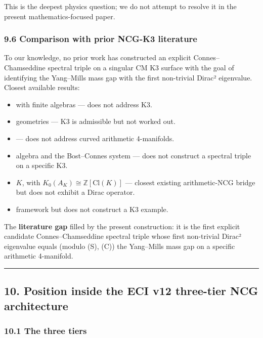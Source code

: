 \documentclass[
  11pt,
  a4paper,
]{amsart}
\providecommand{\tightlist}{\setlength{\itemsep}{0pt}\setlength{\parskip}{0pt}}
\providecommand{\tightlist}{%
  \setlength{\itemsep}{0pt}\setlength{\parskip}{0pt}}
\begin{document}
This is the deepest physics question; we do not attempt to resolve it in the
present mathematics-focused paper.

\hypertarget{comparison-with-prior-ncg-k3-literature}{%
\subsubsection{9.6 Comparison with prior NCG-K3 literature}\label{comparison-with-prior-ncg-k3-literature}}

To our knowledge, no prior work has constructed an explicit
Connes--Chamseddine spectral triple on a singular CM K3 surface with the goal
of identifying the Yang--Mills mass gap with the first non-trivial Dirac²
eigenvalue. Closest available results:

\begin{itemize}
\tightlist
\item
  with finite algebras --- does not address K3.
\item
  geometries --- K3 is admissible but not worked out.
\item
  --- does not address curved arithmetic 4-manifolds.
\item
  algebra and the Bost--Connes system --- does not construct a spectral triple on a
  specific K3.
\item
  \(K\), with \(K_0(A_K) \cong \mathbb{Z}[\mathrm{Cl}(K)]\) --- closest existing
  arithmetic-NCG bridge but does not exhibit a Dirac operator.
\item
  framework but does not construct a K3 example.
\end{itemize}

The \textbf{literature gap} filled by the present construction: it is the first
explicit candidate Connes--Chamseddine spectral triple whose first non-trivial
Dirac² eigenvalue equals (modulo (S), (C)) the Yang--Mills mass gap on a
specific arithmetic 4-manifold.

\begin{center}\rule{0.5\linewidth}{0.5pt}\end{center}

\hypertarget{position-inside-the-eci-v12-three-tier-ncg-architecture}{%
\subsection{10. Position inside the ECI v12 three-tier NCG architecture}\label{position-inside-the-eci-v12-three-tier-ncg-architecture}}

\hypertarget{the-three-tiers}{%
\subsubsection{10.1 The three tiers}\label{the-three-tiers}}
\end{document}
